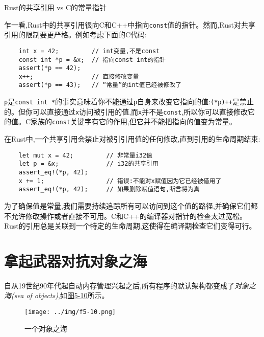 \begin{shaded}
    \begin{center}
        \Large{Rust的共享引用 vs C的常量指针}
    \end{center}

    乍一看,Rust中的共享引用很向C和C++中指向\texttt{const}值的指针。然而,Rust对共享引用的限制要更严格。例如考虑下面的C代码:
    \begin{verbatim}
    int x = 42;         // int变量,不是const
    const int *p = &x;  // 指向const int的指针
    assert(*p == 42);
    x++;                // 直接修改变量
    assert(*p == 43);   // “常量”的int值已经被修改了
    \end{verbatim}

    \texttt{p}是\texttt{const int *}的事实意味着你不能通过\texttt{p}自身来改变它指向的值:\texttt{(*p)++}是禁止的。但你可以直接通过\texttt{x}访问被引用的值,而\texttt{x}并不是\texttt{const},所以你可以直接修改它的值。C家族的\texttt{const}关键字有它的作用,但它并不能把指向的值变为常量。

    在Rust中,一个共享引用会禁止对被引引用值的任何修改,直到引用的生命周期结束:
    \begin{verbatim}
    let mut x = 42;         // 非常量i32值
    let p = &x;             // i32的共享引用
    assert_eq!(*p, 42);
    x += 1;                 // 错误:不能对x赋值因为它已经被借用了
    assert_eq!(*p, 42);     // 如果删除赋值语句,断言将为真
    \end{verbatim}

    为了确保值是常量,我们需要持续追踪所有可以访问到这个值的路径,并确保它们都不允许修改操作或者直接不可用。C和C++的编译器对指针的检查太过宽松。Rust的引用总是关联到一个特定的生命周期,这使得在编译期检查它们变得可行。
\end{shaded}    

\clearpage

\section{拿起武器对抗对象之海}

自从19世纪90年代起自动内存管理兴起之后,所有程序的默认架构都变成了\emph{对象之海(sea of objects)},如\hyperref[f5-10]{图5-10}所示。

\begin{figure}[htbp]
    \centering
    \texttt{[image: ../img/f5-10.png]}
    \caption{一个对象之海}
    \label{f5-10}
\end{figure}

